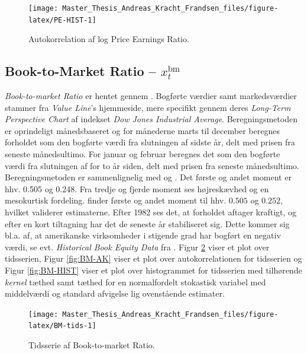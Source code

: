 \documentclass[
  a4paper,
  oneside]{memoir}
\begin{document}
\begin{figure}[htbp!]

{\centering \texttt{[image: Master\_Thesis\_Andreas\_Kracht\_Frandsen\_files/figure-latex/PE-HIST-1]} 

}

\caption{Autokorrelation af log Price Earnings Ratio.}\label{fig:PE-HIST}
\end{figure}

\hypertarget{book-to-market-ratio-x_ttextbm}{%
\subsection{\texorpdfstring{Book-to-Market Ratio -- \(x_t^{\text{bm}}\)}{Book-to-Market Ratio -- x\_t\^{}\{\textbackslash text\{bm\}\}}}\label{book-to-market-ratio-x_ttextbm}}

\emph{Book-to-market Ratio} er hentet gennem \citep{Goyal2007}. Bogførte værdier samt markedsværdier stammer fra \emph{Value Line}'s hjemmeside, mere specifikt gennem deres \emph{Long-Term Perspective Chart} af indekset \emph{Dow Jones Industrial Average}. Beregningsmetoden er oprindeligt månedsbaseret og for månederne marts til december beregnes forholdet som den bogførte værdi fra slutningen af sidste år, delt med prisen fra seneste månedsultimo. For januar og februar beregnes det som den bogførte værdi fra slutningen af for to år siden, delt med prisen fra seneste månedsultimo. Beregningsmetoden er sammenlignelig med \citep{Kothari1997} og \citep{Pontiff1998}. Det første og andet moment er hhv. 0.505 og 0.248. Fra tredje og fjerde moment ses højreskævhed og en mesokurtisk fordeling. \citep{Pontiff1998} finder første og andet moment til hhv. \(0.505\) og \(0.252\), hvilket validerer estimaterne. Efter 1982 ses det, at forholdet aftager kraftigt, og efter en kort tiltagning har det de seneste år stabiliseret sig. Dette kommer sig bl.a. af, at amerikanske virksomheder i stigende grad har bogført en negativ værdi, se evt. \emph{Historical Book Equity Data} fra \citep{French2020}. Figur \ref{fig:BM-tids} viser et plot over tidsserien, Figur \ref{fig:BM-AK} viser et plot over autokorrelationen for tidsserien og Figur \ref{fig:BM-HIST} viser et plot over histogrammet for tidsserien med tilhørende \emph{kernel} tæthed samt tæthed for en normalfordelt stokastisk variabel med middelværdi og standard afvigelse lig ovenstående estimater.

\begin{figure}[htbp!]

{\centering \texttt{[image: Master\_Thesis\_Andreas\_Kracht\_Frandsen\_files/figure-latex/BM-tids-1]} 

}

\caption{Tidsserie af Book-to-market Ratio.}\label{fig:BM-tids}
\end{figure}
\end{document}
